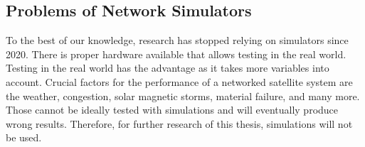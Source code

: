 \subsection{Problems of Network Simulators}

To the best of our knowledge, research has stopped relying on simulators since 2020.
There is proper hardware available that allows testing in the real world. Testing in the
real world has the advantage as it takes more variables into account. Crucial factors
for the performance of a networked satellite system are the weather, congestion, solar magnetic
storms, material failure, and many more. Those cannot be ideally tested with simulations
and will eventually produce wrong results. Therefore, for further research of this thesis,
simulations will not be used.
